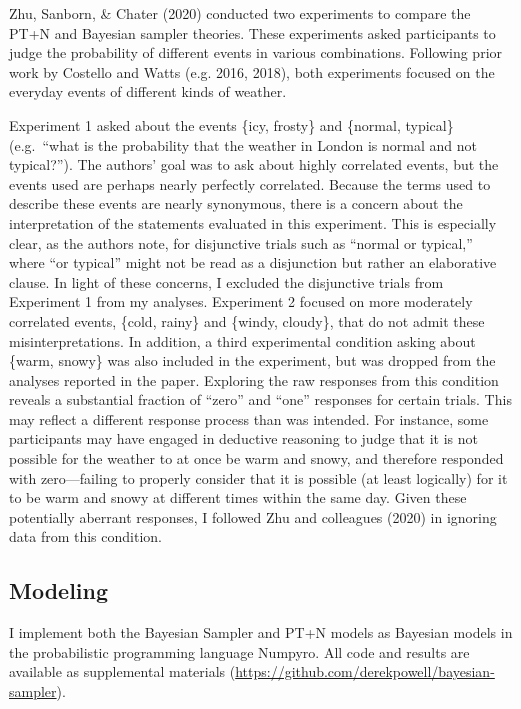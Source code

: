\documentclass{article}
\begin{document}
Zhu, Sanborn, \& Chater (2020) conducted two experiments to compare the
PT+N and Bayesian sampler theories. These experiments asked participants
to judge the probability of different events in various combinations.
Following prior work by Costello and Watts (e.g. 2016, 2018), both
experiments focused on the everyday events of different kinds of
weather.

Experiment 1 asked about the events \{icy, frosty\} and \{normal,
typical\} (e.g.~``what is the probability that the weather in London is
normal and not typical?''). The authors' goal was to ask about highly
correlated events, but the events used are perhaps nearly perfectly
correlated. Because the terms used to describe these events are nearly
synonymous, there is a concern about the interpretation of the
statements evaluated in this experiment. This is especially clear, as
the authors note, for disjunctive trials such as ``normal or typical,''
where ``or typical'' might not be read as a disjunction but rather an
elaborative clause. In light of these concerns, I excluded the
disjunctive trials from Experiment 1 from my analyses. Experiment 2
focused on more moderately correlated events, \{cold, rainy\} and
\{windy, cloudy\}, that do not admit these misinterpretations. In
addition, a third experimental condition asking about \{warm, snowy\}
was also included in the experiment, but was dropped from the analyses
reported in the paper. Exploring the raw responses from this condition
reveals a substantial fraction of ``zero'' and ``one'' responses for
certain trials. This may reflect a different response process than was
intended. For instance, some participants may have engaged in deductive
reasoning to judge that it is not possible for the weather to at once be
warm and snowy, and therefore responded with zero---failing to properly
consider that it is possible (at least logically) for it to be warm and
snowy at different times within the same day. Given these potentially
aberrant responses, I followed Zhu and colleagues (2020) in ignoring
data from this condition.

\hypertarget{modeling}{%
\subsection{Modeling}\label{modeling}}

I implement both the Bayesian Sampler and PT+N models as Bayesian models
in the probabilistic programming language Numpyro. All code and results
are available as supplemental materials
(\url{https://github.com/derekpowell/bayesian-sampler}).
\end{document}
